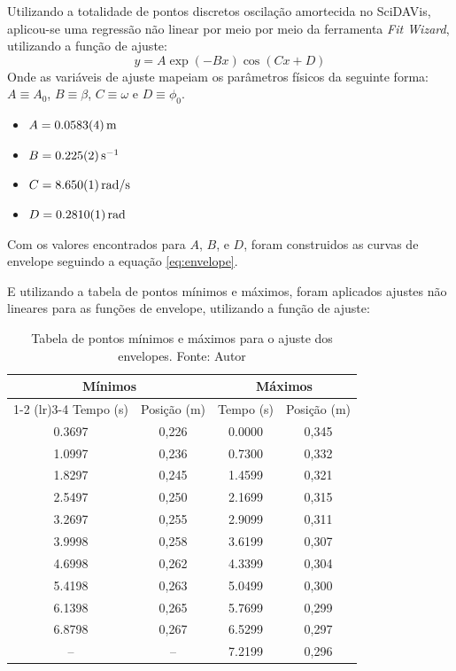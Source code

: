 \documentclass[12pt,a4paper]{article}
\begin{document}
Utilizando a totalidade de pontos discretos oscilação amortecida no SciDAVis, aplicou-se uma regressão não linear por meio por meio da ferramenta \textit{Fit Wizard}, utilizando a função de ajuste:
\begin{equation}
    y = A\exp(-Bx)\cos(Cx + D)
\end{equation}
Onde as variáveis de ajuste mapeiam os parâmetros físicos da seguinte forma: $A \equiv A_0$, $B \equiv \beta$, $C \equiv \omega$ e $D \equiv \phi_0$.
\begin{itemize}
    \item $A = \SI{0.0583 \pm 0.0004}{\meter}$
    \item $B = \SI{0.225 \pm 0.002}{\second^{-1}}$
    \item $C = \SI{8.65 \pm 0.001}{\text{rad}/\second}$
    \item $D = \SI{0.281 \pm 0.0001}{\text{rad}}$
\end{itemize}

Com os valores encontrados para $A$, $B$, e $D$, foram construidos as curvas de envelope seguindo a equação \ref{eq:envelope}.

E utilizando a tabela de pontos mínimos e máximos, foram aplicados ajustes não lineares para as funções de envelope, utilizando a função de ajuste:


\begin{table}[H]
    \centering
    \caption{Tabela de pontos mínimos e máximos para o ajuste dos envelopes. Fonte: Autor}
    \label{tab:tabela_min_max}
    \begin{tabular}{cccc}
        \toprule
        \multicolumn{2}{c}{\textbf{Mínimos}} & \multicolumn{2}{c}{\textbf{Máximos}} \\
        \cmidrule(lr){1-2} \cmidrule(lr){3-4}
        Tempo (s) & Posição (m) & Tempo (s) & Posição (m) \\
        \midrule
        0.3697 & 0,226 & 0.0000 & 0,345 \\
        1.0997 & 0,236 & 0.7300 & 0,332 \\
        1.8297 & 0,245 & 1.4599 & 0,321 \\
        2.5497 & 0,250 & 2.1699 & 0,315 \\
        3.2697 & 0,255 & 2.9099 & 0,311 \\
        3.9998 & 0,258 & 3.6199 & 0,307 \\
        4.6998 & 0,262 & 4.3399 & 0,304 \\
        5.4198 & 0,263 & 5.0499 & 0,300 \\
        6.1398 & 0,265 & 5.7699 & 0,299 \\
        6.8798 & 0,267 & 6.5299 & 0,297 \\
        --     & --    & 7.2199 & 0,296 \\
        \bottomrule
    \end{tabular}
\end{table}
\end{document}
